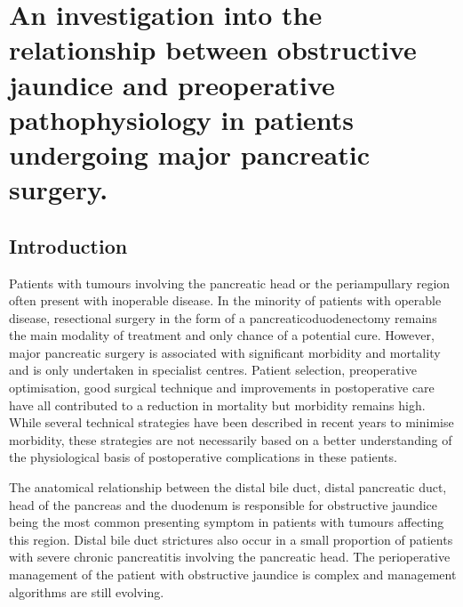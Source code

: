 
\chapter{An investigation into the relationship between obstructive jaundice and preoperative pathophysiology in patients undergoing major pancreatic surgery.}

\label{ch_cpet_jaundice}


\clearpage


\section{Introduction}
Patients with tumours involving the pancreatic head or the periampullary region often present with inoperable disease. In the minority of patients with operable disease, resectional surgery in the form of a pancreaticoduodenectomy remains the main modality of treatment and only chance of a potential cure. However, major pancreatic surgery is associated with significant morbidity and mortality and is only undertaken in specialist centres. Patient selection, preoperative optimisation, good surgical technique and improvements in postoperative care have all contributed to a reduction in mortality \parencite{winter_1423_2006} but morbidity remains high. While several technical strategies have been described in recent years to minimise morbidity, these strategies are not necessarily based on a better understanding of the physiological basis of postoperative complications in these patients.

The anatomical relationship between the distal bile duct, distal pancreatic duct, head of the pancreas and the duodenum is responsible for obstructive jaundice being the most common presenting symptom in patients with tumours affecting this region. Distal bile duct strictures also occur in a small proportion of patients with severe chronic pancreatitis involving the pancreatic head. The perioperative management of the patient with obstructive jaundice is complex and management algorithms are still evolving. 

